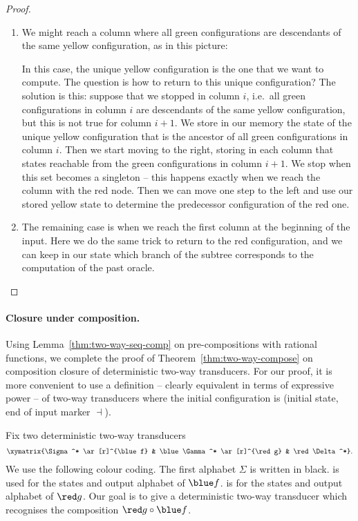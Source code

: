 \begin{proof}
\begin{enumerate}
	\item We might reach a column where all green configurations are descendants of the same  yellow configuration, as in this picture: 





In this case, the unique yellow configuration is the one that we want to compute. The question is how to return to this unique configuration? The solution is this: suppose that we stopped in column $i$, i.e.~all green configurations in column $i$ are descendants of the same yellow configuration, but this is not true for column $i+1$. We store  in our memory the state of the unique yellow configuration that is the ancestor of all green configurations in column $i$. Then we start moving to the right, storing in each column that states reachable from the green configurations in column $i+1$. We stop when this set becomes a singleton -- this happens exactly when we reach the column with the red node. Then we can move one step to the left and use our stored yellow state to determine the predecessor configuration of the red one.
\item  The remaining case is when we reach the first column at the beginning of the input. Here we do the same trick to return to the red configuration, and we can keep in our state which branch of the subtree corresponds to the computation of the past oracle. 

\end{enumerate}


\end{proof}

\paragraph*{Closure under composition.} Using Lemma~\ref{thm:two-way-seq-comp} on pre-compositions with rational functions, we  complete the proof of Theorem~\ref{thm:two-way-compose} on composition closure  of deterministic two-way transducers. For our proof, it is more convenient to use a definition -- clearly equivalent in terms of expressive power -- of two-way transducers where the initial configuration is  (initial state, end of input marker $\dashv$). 

 Fix  two deterministic two-way transducers  
\begin{align*}
  \xymatrix{\Sigma^* \ar[r]^{\blue f} & \blue \Gamma^* \ar[r]^{\red g} & \red \Delta^*}.
\end{align*}
We use the following colour coding.
The  first  alphabet $\Sigma$  is written in black.   is used for the states and output alphabet  of  $\blue f$.   is for the states and output alphabet  of $\red g$.  Our goal is to give a deterministic two-way transducer which recognises the composition $\red g \circ \blue f$.

